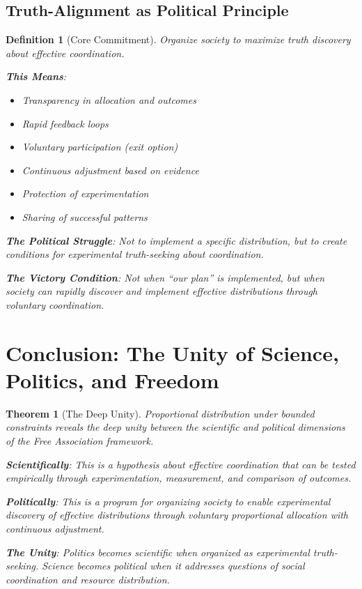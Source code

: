 \documentclass[11pt]{article}
\newtheorem{definition}{Definition}
\newtheorem{theorem}{Theorem}
\begin{document}
\subsection{Truth-Alignment as Political Principle}

\begin{definition}[Core Commitment]
Organize society to maximize truth discovery about effective coordination.

\textbf{This Means}:
\begin{itemize}
\item Transparency in allocation and outcomes
\item Rapid feedback loops
\item Voluntary participation (exit option)
\item Continuous adjustment based on evidence
\item Protection of experimentation
\item Sharing of successful patterns
\end{itemize}

\textbf{The Political Struggle}: Not to implement a specific distribution, but to create conditions for experimental truth-seeking about coordination.

\textbf{The Victory Condition}: Not when ``our plan'' is implemented, but when society can rapidly discover and implement effective distributions through voluntary coordination.
\end{definition}

\section{Conclusion: The Unity of Science, Politics, and Freedom}

\begin{theorem}[The Deep Unity]
Proportional distribution under bounded constraints reveals the deep unity between the scientific and political dimensions of the Free Association framework.

\textbf{Scientifically}: This is a hypothesis about effective coordination that can be tested empirically through experimentation, measurement, and comparison of outcomes.

\textbf{Politically}: This is a program for organizing society to enable experimental discovery of effective distributions through voluntary proportional allocation with continuous adjustment.

\textbf{The Unity}: Politics becomes scientific when organized as experimental truth-seeking. Science becomes political when it addresses questions of social coordination and resource distribution.
\end{theorem}
\end{document}
